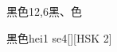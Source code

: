 \begin{entry}{黑色}{12,6}{⿊、⾊}
  \begin{phonetics}{黑色}{hei1 se4}[][HSK 2]
  \end{phonetics}
\end{entry}
